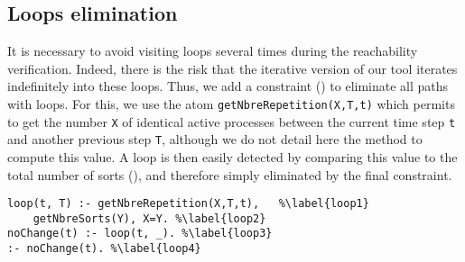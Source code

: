 \subsection{Loops elimination}
\label{sec:loops}

It is necessary to avoid visiting loops several times during the reachability verification.
Indeed, there is the risk that the iterative version of our tool iterates indefinitely into these loops.
Thus, we add a constraint () to eliminate all paths with loops.
For this, we use the atom \texttt{getNbreRepetition(X,T,t)} which permits to get the number \texttt{X} of identical active processes
between the current time step \texttt{t} and another previous step \texttt{T},
although we do not detail here the method to compute this value.
A loop is then easily detected by comparing this value to the total number of sorts (),
and therefore simply eliminated by the final constraint.
\begin{lstlisting}
loop(t, T) :- getNbreRepetition(X,T,t),   %\label{loop1}
	getNbreSorts(Y), X=Y. %\label{loop2}
noChange(t) :- loop(t, _). %\label{loop3}
:- noChange(t). %\label{loop4}
\end{lstlisting}

